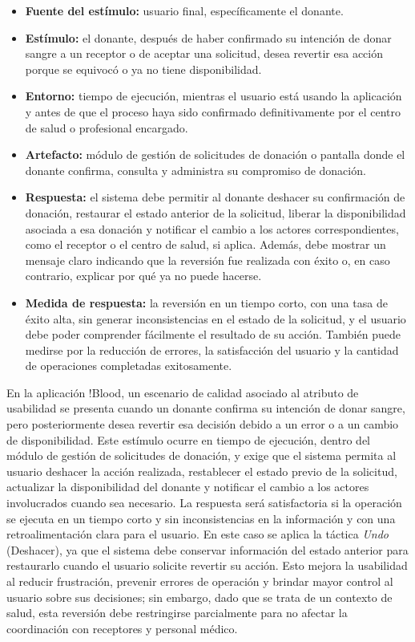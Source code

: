 \begin{itemize}
    \item \textbf{Fuente del estímulo:} usuario final, específicamente el donante.
    \item \textbf{Estímulo:} el donante, después de haber confirmado su intención de donar sangre a un receptor o de aceptar una solicitud, desea revertir esa acción porque se equivocó o ya no tiene disponibilidad.
    \item \textbf{Entorno:} tiempo de ejecución, mientras el usuario está usando la aplicación y antes de que el proceso haya sido confirmado definitivamente por el centro de salud o profesional encargado.
    \item \textbf{Artefacto:} módulo de gestión de solicitudes de donación o pantalla donde el donante confirma, consulta y administra su compromiso de donación.
    \item \textbf{Respuesta:} el sistema debe permitir al donante deshacer su confirmación de donación, restaurar el estado anterior de la solicitud, liberar la disponibilidad asociada a esa donación y notificar el cambio a los actores correspondientes, como el receptor o el centro de salud, si aplica. Además, debe mostrar un mensaje claro indicando que la reversión fue realizada con éxito o, en caso contrario, explicar por qué ya no puede hacerse.
    \item \textbf{Medida de respuesta:} la reversión en un tiempo corto, con una tasa de éxito alta, sin generar inconsistencias en el estado de la solicitud, y el usuario debe poder comprender fácilmente el resultado de su acción. También puede medirse por la reducción de errores, la satisfacción del usuario y la cantidad de operaciones completadas exitosamente.
\end{itemize}

En la aplicación !Blood, un escenario de calidad asociado al atributo de usabilidad se presenta cuando un donante confirma su intención de donar sangre, pero posteriormente desea revertir esa decisión debido a un error o a un cambio de disponibilidad. Este estímulo ocurre en tiempo de ejecución, dentro del módulo de gestión de solicitudes de donación, y exige que el sistema permita al usuario deshacer la acción realizada, restablecer el estado previo de la solicitud, actualizar la disponibilidad del donante y notificar el cambio a los actores involucrados cuando sea necesario. La respuesta será satisfactoria si la operación se ejecuta en un tiempo corto y sin inconsistencias en la información y con una retroalimentación clara para el usuario. En este caso se aplica la táctica \textit{Undo} (Deshacer), ya que el sistema debe conservar información del estado anterior para restaurarlo cuando el usuario solicite revertir su acción. Esto mejora la usabilidad al reducir frustración, prevenir errores de operación y brindar mayor control al usuario sobre sus decisiones; sin embargo, dado que se trata de un contexto de salud, esta reversión debe restringirse parcialmente para no afectar la coordinación con receptores y personal médico.

